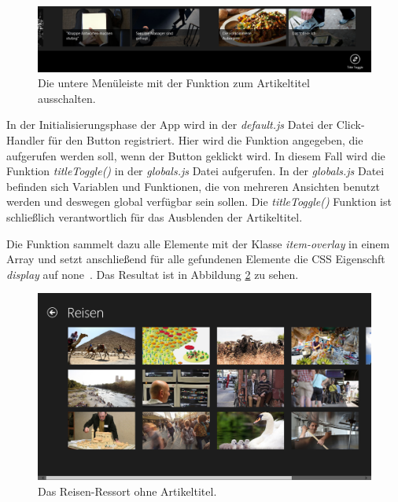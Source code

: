 \documentclass[12pt,a4paper,bibtotoc,abstracton]{scrartcl}
\begin{document}
\begin{figure}[h]
	\centering
	\includegraphics[width=\textwidth]{Bilder/Screenshots/app/title_toggle_menu_bar.png} 
	\caption{Die untere Menüleiste mit der Funktion zum Artikeltitel ausschalten.}
	\label{fig:menubartitletoggle}
\end{figure}

In der Initialisierungsphase der App wird in der \textit{default.js} Datei der Click-Handler für den Button registriert. Hier wird die Funktion angegeben, die aufgerufen werden soll, wenn der Button geklickt wird. In diesem Fall wird die Funktion \textit{titleToggle()} in der \textit{globals.js} Datei aufgerufen. In der \textit{globals.js} Datei befinden sich Variablen und Funktionen, die von mehreren Ansichten benutzt werden und deswegen global verfügbar sein sollen. Die \textit{titleToggle()} Funktion ist schließlich verantwortlich für das Ausblenden der Artikeltitel.

Die Funktion sammelt dazu alle Elemente mit der Klasse \textit{item-overlay} in einem Array und setzt anschließend für alle gefundenen Elemente die CSS Eigenschft \textit{display} auf \glqq none\grqq\ . Das Resultat ist in Abbildung \ref{fig:ressortohnetitel} zu sehen.

\begin{figure}[h]
	\centering
	\includegraphics[width=\textwidth]{Bilder/Screenshots/app/reise_aegypten_3gdohne.png} 
	\caption{Das Reisen-Ressort ohne Artikeltitel.}
	\label{fig:ressortohnetitel}
\end{figure}
\end{document}
